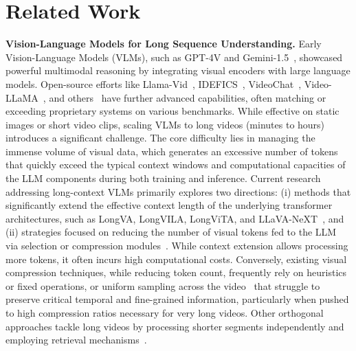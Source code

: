 \vspace{-1pt}

\section{Related Work}
\vspace{-1pt}


\noindent \textbf{Vision-Language Models for Long Sequence Understanding.}\;\; 
Early Vision-Language Models (VLMs), such as GPT-4V and Gemini-1.5~\cite{openai2024gpt4ocard, geminiteam2024gemini15unlockingmultimodal}, showcased powerful multimodal reasoning by integrating visual encoders with large language models. Open-source efforts like Llama-Vid~\cite{li2024llama}, IDEFICS~\cite{idefics2023}, VideoChat~\cite{li2023videochat}, Video-LLaMA~\cite{cheng2024videollama}, and others~\cite{li2024videochat, lin2023video, wang2022internvideo, wang2024internvideo2, li2024llava, luo2023valley, ataallah2024minigpt4} have further advanced capabilities, often matching or exceeding proprietary systems on various benchmarks. While effective on static images or short video clips, scaling VLMs to long videos (minutes to hours) introduces a significant challenge. The core difficulty lies in managing the immense volume of visual data, which generates an excessive number of tokens that quickly exceed the typical context windows and computational capacities of the LLM components during both training and inference. Current research addressing long-context VLMs primarily explores two directions: (i) methods that significantly extend the effective context length of the underlying transformer architectures, such as LongVA, LongVILA, LongViTA, and LLaVA-NeXT~\cite{zhang2024long, chen2024longvila, shen2025long, zhang2024llavanext}, and (ii) strategies focused on reducing the number of visual tokens fed to the LLM via selection or compression modules~\cite{korbar2024text, jin2024chat, shu2024video, song2024moviechat}. While context extension allows processing more tokens, it often incurs high computational costs. Conversely, existing visual compression techniques, while reducing token count, frequently rely on heuristics or fixed operations, or uniform sampling across the video~\cite{li2023videochat, cheng2024videollama, zhang2024long, li2024llava, li2024videochat, ataallah2024minigpt4} that struggle to preserve critical temporal and fine-grained information, particularly when pushed to high compression ratios necessary for very long videos. Other orthogonal approaches tackle long videos by processing shorter segments independently and employing retrieval mechanisms~\cite{ataallah2024goldfish}.

